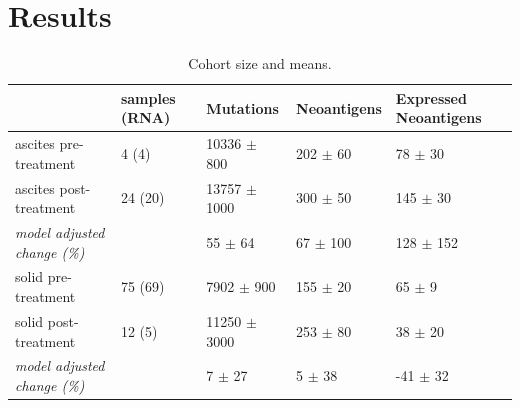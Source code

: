 \section*{Results}

\begin{table}[htbp]


\begin{tabular}{lllll}
\toprule
{} & samples (RNA) &         Mutations &   Neoantigens & Expressed Neoantigens \\
\midrule
ascites pre-treatment                 &         4 (4) &   10336 $\pm$ 800 &  202 $\pm$ 60 &           78 $\pm$ 30 \\
ascites post-treatment                &       24 (20) &  13757 $\pm$ 1000 &  300 $\pm$ 50 &          145 $\pm$ 30 \\
\textit{model adjusted change (\%)} &               &       55 $\pm$ 64 &  67 $\pm$ 100 &         128 $\pm$ 152 \\
\hline
solid pre-treatment                   &       75 (69) &    7902 $\pm$ 900 &  155 $\pm$ 20 &            65 $\pm$ 9 \\
solid post-treatment                  &        12 (5) &  11250 $\pm$ 3000 &  253 $\pm$ 80 &           38 $\pm$ 20 \\
\textit{model adjusted change (\%)}   &               &        7 $\pm$ 27 &    5 $\pm$ 38 &          -41 $\pm$ 32 \\
\bottomrule
\end{tabular}



\caption{Cohort size and means.}
\label{tab:cohort}
\end{table}

